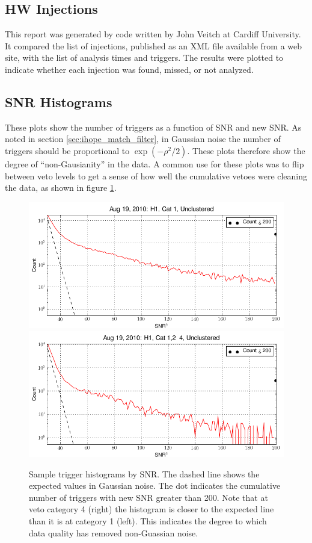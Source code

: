 \subsection{HW Injections}

This report was generated by code written by John Veitch  at Cardiff
University.  It compared the list of injections, published as an XML
file available from a web site, with the list of analysis times and
triggers.  The results were plotted to indicate whether each injection
was found, missed, or not analyzed.

\subsection{SNR Histograms}

These plots show the number of triggers as a function of SNR and new
SNR.  As noted in section \ref{sec:ihope_match_filter}, in Gaussian
noise the number of triggers should be proportional to
$\exp(-\rho^2/2)$.  These plots therefore show the degree of
``non-Gausianity'' in the data.  A common use for these plots was to
flip between veto levels to get a sense of how well the cumulative
vetoes were cleaning the data, as shown in figure
\ref{f:daily_ihope_gaussianity}.


\begin{figure}
  \includegraphics[width=0.5\linewidth]{figures/detchar/H1_1_UNCLUSTERED_snr_hist.png}
  \includegraphics[width=0.5\linewidth]{figures/detchar/H1_4_UNCLUSTERED_snr_hist.png}
  \caption[Trigger histograms for H1]{
  \label{f:daily_ihope_gaussianity}
Sample trigger histograms by SNR.  The dashed line shows the
expected values in Gaussian noise.  The dot indicates the cumulative
number of triggers with new SNR greater than 200.  Note that at veto
category 4 (right) the histogram is closer to the expected line than
it is at category 1 (left).  This indicates the degree to which data
quality has removed non-Guassian noise.}
\end{figure}%


